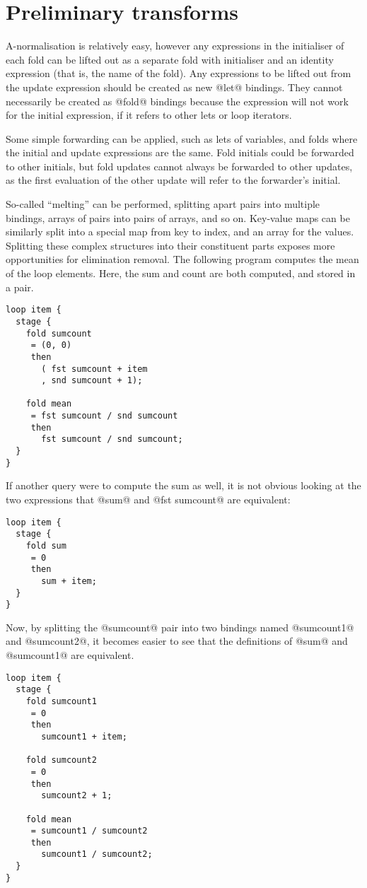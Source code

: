 \section{Preliminary transforms}

A-normalisation is relatively easy, however any expressions in the initialiser of each fold can be lifted out as a separate fold with initialiser and an identity expression (that is, the name of the fold).
Any expressions to be lifted out from the update expression should be created as new @let@ bindings.
They cannot necessarily be created as @fold@ bindings because the expression will not work for the initial expression, if it refers to other lets or loop iterators.

Some simple forwarding can be applied, such as lets of variables, and folds where the initial and update expressions are the same.
Fold initials could be forwarded to other initials, but fold updates cannot always be forwarded to other updates, as the first evaluation of the other update will refer to the forwarder's initial.

So-called ``melting'' can be performed, splitting apart pairs into multiple bindings, arrays of pairs into pairs of arrays, and so on.
Key-value maps can be similarly split into a special map from key to index, and an array for the values.
Splitting these complex structures into their constituent parts exposes more opportunities for elimination removal.
The following program computes the mean of the loop elements. Here, the sum and count are both computed, and stored in a pair.

\begin{lstlisting}
loop item {
  stage {
    fold sumcount
     = (0, 0)
     then
       ( fst sumcount + item
       , snd sumcount + 1);

    fold mean
     = fst sumcount / snd sumcount
     then
       fst sumcount / snd sumcount;
  }
}
\end{lstlisting}

If another query were to compute the sum as well, it is not obvious looking at the two expressions that @sum@ and @fst sumcount@ are equivalent:
\begin{lstlisting}
loop item {
  stage {
    fold sum
     = 0
     then
       sum + item;
  }
}
\end{lstlisting}

Now, by splitting the @sumcount@ pair into two bindings named @sumcount1@ and @sumcount2@, it becomes easier to see that the definitions of @sum@ and @sumcount1@ are equivalent.
\begin{lstlisting}
loop item {
  stage {
    fold sumcount1
     = 0
     then
       sumcount1 + item;

    fold sumcount2
     = 0
     then
       sumcount2 + 1;

    fold mean
     = sumcount1 / sumcount2
     then
       sumcount1 / sumcount2;
  }
}
\end{lstlisting}


